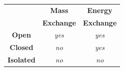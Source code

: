 \documentclass[10pt,compress]{beamer}
\begin{document}
\begin{frame}
\begin{columns}
\begin{column}[l]{0.45\linewidth}
\begin{figure}
      \end{figure}
      \begin{tabular}{|c|c|c|}
         \hline
                      & {\bf Mass} & {\bf Energy} \\
                      & {\bf Exchange} & {\bf Exchange} \\
         \hline
         {\bf Open}   & {\it yes}  & {\it yes}    \\
         {\bf Closed} & {\it no}   & {\it yes}    \\
         {\bf Isolated}&{\it no}   & {\it no}     \\
         \hline 
      \end{tabular}    
    \end{column}
  \end{columns}
\end{frame}
\normalsize
\end{document}
